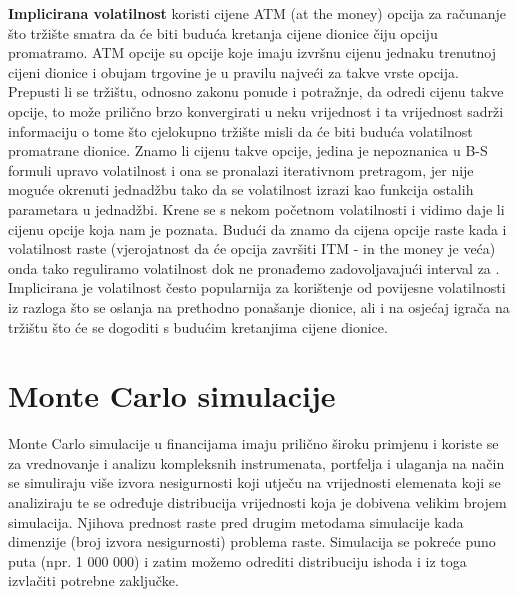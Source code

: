 \documentclass[times, utf8, seminar]{fer}
\begin{document}
\textbf{Implicirana volatilnost}  koristi cijene ATM (at the money) opcija za računanje što tržište smatra da će biti buduća kretanja cijene dionice čiju opciju promatramo. ATM opcije su opcije koje imaju izvršnu cijenu jednaku trenutnoj cijeni dionice i obujam trgovine je u pravilu najveći za takve vrste opcija. Prepusti li se tržištu, odnosno zakonu ponude i potražnje, da odredi cijenu takve opcije, to može prilično brzo konvergirati u neku vrijednost i ta vrijednost sadrži informaciju o tome što cjelokupno tržište misli da će biti buduća volatilnost promatrane dionice. Znamo li cijenu takve opcije, jedina je nepoznanica u B-S formuli upravo volatilnost i ona se pronalazi iterativnom pretragom, jer nije moguće okrenuti jednadžbu tako da se volatilnost izrazi kao funkcija ostalih parametara u jednadžbi. Krene se s nekom početnom volatilnosti i vidimo daje li cijenu opcije koja nam je poznata. Budući da znamo da cijena opcije raste kada i volatilnost raste (vjerojatnost da će opcija završiti ITM - in the money je veća) onda tako reguliramo volatilnost dok ne pronađemo zadovoljavajući interval za . Implicirana je volatilnost često popularnija za korištenje od povijesne volatilnosti iz razloga što se oslanja na prethodno ponašanje dionice, ali i na osjećaj igrača na tržištu što će se dogoditi s budućim kretanjima cijene dionice.


\chapter{Monte Carlo simulacije}

Monte Carlo simulacije u financijama imaju prilično široku primjenu i koriste se za vrednovanje i analizu kompleksnih instrumenata, portfelja i ulaganja na način se simuliraju više izvora nesigurnosti koji utječu na vrijednosti elemenata koji se analiziraju te se određuje distribucija vrijednosti koja je dobivena velikim brojem simulacija. Njihova prednost raste pred drugim metodama simulacije kada dimenzije (broj izvora nesigurnosti) problema raste. Simulacija se pokreće puno puta (npr. 1 000 000) i zatim možemo odrediti distribuciju ishoda i iz toga izvlačiti potrebne zaključke.
\end{document}

